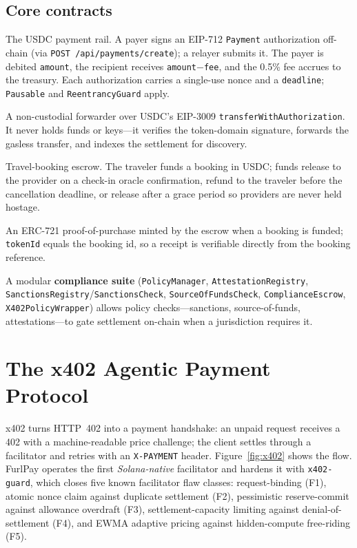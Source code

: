 \documentclass[10pt,twocolumn]{article}
\begin{document}
\subsection{Core contracts}
\begin{description}[leftmargin=1em,style=nextline,itemsep=2pt]
  \item[\texttt{FurlPayRouter}] The USDC payment rail. A payer signs an EIP-712
        \texttt{Payment} authorization off-chain (via
        \texttt{POST\ /api/payments/create}); a relayer submits it. The payer is
        debited \texttt{amount}, the
        recipient receives \texttt{amount}$-$\texttt{fee}, and the 0.5\% fee accrues
        to the treasury. Each authorization carries a single-use nonce and a
        \texttt{deadline}; \texttt{Pausable} and \texttt{ReentrancyGuard} apply.
  \item[\texttt{X402Facilitator}] A non-custodial forwarder over USDC's EIP-3009
        \texttt{transferWithAuthorization}. It never holds funds or keys---it
        verifies the token-domain signature, forwards the gasless transfer, and
        indexes the settlement for discovery.
  \item[\texttt{FurlPayEscrow}] Travel-booking escrow. The traveler funds a booking
        in USDC; funds release to the provider on a check-in oracle confirmation,
        refund to the traveler before the cancellation deadline, or release after a
        grace period so providers are never held hostage.
  \item[\texttt{BookingReceipt}] An ERC-721 proof-of-purchase minted by the escrow
        when a booking is funded; \texttt{tokenId} equals the booking id, so a
        receipt is verifiable directly from the booking reference.
\end{description}

A modular \textbf{compliance suite} (\texttt{PolicyManager},
\texttt{AttestationRegistry}, \texttt{SanctionsRegistry}/\texttt{SanctionsCheck},
\texttt{SourceOfFundsCheck}, \texttt{ComplianceEscrow},
\texttt{X402PolicyWrapper}) allows policy checks---sanctions, source-of-funds,
attestations---to gate settlement on-chain when a jurisdiction requires it.

\section{The x402 Agentic Payment Protocol}\label{sec:x402}
x402 turns HTTP~402 into a payment handshake: an unpaid request receives a 402 with
a machine-readable price challenge; the client settles through a facilitator and
retries with an \texttt{X-PAYMENT} header. Figure~\ref{fig:x402} shows the flow.
FurlPay operates the first \emph{Solana-native} facilitator and hardens it with
\texttt{x402-guard}, which closes five known facilitator flaw classes:
request-binding (F1), atomic nonce claim against duplicate settlement (F2),
pessimistic reserve-commit against allowance overdraft (F3), settlement-capacity
limiting against denial-of-settlement (F4), and EWMA adaptive pricing against
hidden-compute free-riding (F5).
\end{document}
